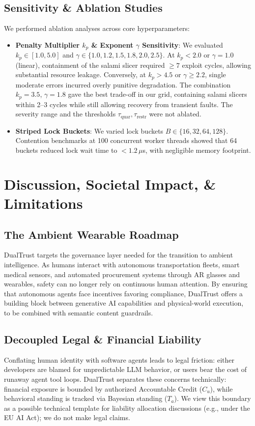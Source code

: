 \documentclass[journal]{IEEEtran}
\begin{document}
\subsection{Sensitivity \& Ablation Studies}
We performed ablation analyses across core hyperparameters:
\begin{itemize}[leftmargin=12pt, topsep=2pt, itemsep=1pt]
\item \textbf{Penalty Multiplier $k_p$ \& Exponent $\gamma$ Sensitivity}: We evaluated $k_p \in [1.0, 5.0]$ and $\gamma \in \{1.0, 1.2, 1.5, 1.8, 2.0, 2.5\}$. At $k_p < 2.0$ or $\gamma = 1.0$ (linear), containment of the salami slicer required $\ge 7$ exploit cycles, allowing substantial resource leakage. Conversely, at $k_p > 4.5$ or $\gamma \ge 2.2$, single moderate errors incurred overly punitive degradation. The combination $k_p = 3.5$, $\gamma = 1.8$ gave the best trade-off in our grid, containing salami slicers within 2--3 cycles while still allowing recovery from transient faults. The severity range and the thresholds $\tau_{\text{quar}}, \tau_{\text{restr}}$ were not ablated.
\item \textbf{Striped Lock Buckets}: We varied lock buckets $B \in \{16, 32, 64, 128\}$. Contention benchmarks at 100 concurrent worker threads showed that 64 buckets reduced lock wait time to $<1.2\,\mu$s, with negligible memory footprint.
\end{itemize}

\section{Discussion, Societal Impact, \& Limitations}
\label{sec:discussion}

\subsection{The Ambient Wearable Roadmap}
DualTrust targets the governance layer needed for the transition to ambient intelligence. As humans interact with autonomous transportation fleets, smart medical sensors, and automated procurement systems through AR glasses and wearables, safety can no longer rely on continuous human attention. By ensuring that autonomous agents face incentives favoring compliance, DualTrust offers a building block between generative AI capabilities and physical-world execution, to be combined with semantic content guardrails.

\subsection{Decoupled Legal \& Financial Liability}
Conflating human identity with software agents leads to legal friction: either developers are blamed for unpredictable LLM behavior, or users bear the cost of runaway agent tool loops. DualTrust separates these concerns technically: financial exposure is bounded by authorized Accountable Credit ($C_u$), while behavioral standing is tracked via Bayesian standing ($T_a$). We view this boundary as a possible technical template for liability allocation discussions (e.g., under the EU AI Act); we do not make legal claims.
\end{document}
